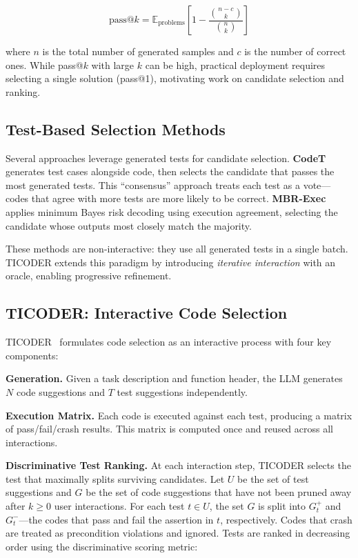 \documentclass[conference]{IEEEtran}
\begin{document}
\begin{equation}
    \text{pass@}k = \mathbb{E}_{\text{problems}} \left[ 1 - \frac{\binom{n-c}{k}}{\binom{n}{k}} \right]
\end{equation}

where $n$ is the total number of generated samples and $c$ is the number of correct ones. While pass@$k$ with large $k$ can be high, practical deployment requires selecting a single solution (pass@1), motivating work on candidate selection and ranking.

\subsection{Test-Based Selection Methods}

Several approaches leverage generated tests for candidate selection. \textbf{CodeT}~\cite{chen2022codet} generates test cases alongside code, then selects the candidate that passes the most generated tests. This ``consensus'' approach treats each test as a vote---codes that agree with more tests are more likely to be correct. \textbf{MBR-Exec}~\cite{shi2022mbr} applies minimum Bayes risk decoding using execution agreement, selecting the candidate whose outputs most closely match the majority.

These methods are non-interactive: they use all generated tests in a single batch. TICODER extends this paradigm by introducing \emph{iterative interaction} with an oracle, enabling progressive refinement.

\subsection{TICODER: Interactive Code Selection}

TICODER~\cite{ticoder} formulates code selection as an interactive process with four key components:

\textbf{Generation.} Given a task description and function header, the LLM generates $N$ code suggestions and $T$ test suggestions independently.

\textbf{Execution Matrix.} Each code is executed against each test, producing a matrix of pass/fail/crash results. This matrix is computed once and reused across all interactions.

\textbf{Discriminative Test Ranking.} At each interaction step, TICODER selects the test that maximally splits surviving candidates. Let $U$ be the set of test suggestions and $G$ be the set of code suggestions that have not been pruned away after $k \geq 0$ user interactions. For each test $t \in U$, the set $G$ is split into $G_t^+$ and $G_t^-$---the codes that pass and fail the assertion in $t$, respectively. Codes that crash are treated as precondition violations and ignored. Tests are ranked in decreasing order using the discriminative scoring metric:
\end{document}
